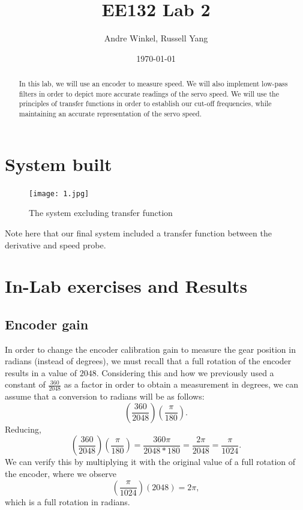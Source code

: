 \documentclass{article}
\title{EE132 Lab 2}
\author{Andre Winkel, Russell Yang}
\date{\today}
\begin{document}
\maketitle

\begin{abstract}
    In this lab, we will use an encoder to measure speed. We will also implement low-pass filters in order to depict more accurate readings of the servo speed. We will use the principles of transfer functions in order to establish our cut-off frequencies, while maintaining an accurate representation of the servo speed.
\end{abstract}

\section{System built}
\begin{figure} [H]
    \centering
    \texttt{[image: 1.jpg]}
    \caption{The system excluding transfer function}
    \label{fig:1}
\end{figure}
Note here that our final system included a transfer function between the derivative and speed probe.

\section{In-Lab exercises and Results}
\subsection{Encoder gain}
In order to change the encoder calibration gain to measure the gear position in radians (instead of degrees), we must recall that a full rotation of the encoder results in a value of $2048$. Considering this and how we previously used a constant of $\frac{360}{2048}$ as a factor in order to obtain a measurement in degrees, we can assume that a conversion to radians will be as follows:
\begin{equation}
    (\frac{360}{2048})(\frac{\pi}{180}).
\end{equation}
Reducing,
\begin{equation}
    (\frac{360}{2048})(\frac{\pi}{180})=\frac{360\pi}{2048*180}=\frac{2\pi}{2048}=\frac{\pi}{1024}.
\end{equation}
We can verify this by multiplying it with the original value of a full rotation of the encoder, where we observe
\begin{equation}
    (\frac{\pi}{1024})(2048)=2\pi,
\end{equation}
which is a full rotation in radians.
\end{document}
